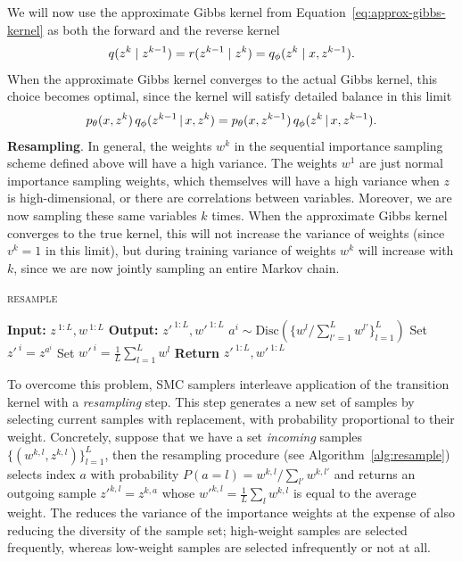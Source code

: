 \documentclass{article}
\theoremstyle{definition}
\begin{document}
We will now use the approximate Gibbs kernel from Equation~\ref{eq:approx-gibbs-kernel} as both the forward and the reverse kernel
\begin{align}
    q(z^{k} \mid  z^{k-1}) = r(z^{k-1} \mid  z^k) = q_\phi(z^k \mid x, z^{k-1}).
\end{align}
When the approximate Gibbs kernel converges to the actual Gibbs kernel, this choice becomes optimal, since the kernel will satisfy detailed balance in this limit
\begin{align*}
    p_\theta(x, z^k) 
    \,
    q_\phi(z^{k-1} \,|\, x, z^{k})
    =
    p_\theta(x, z^{k-1}) 
    \,
    q_\phi(z^{k} \,|\, x, z^{k-1}).
\end{align*}
\textbf{Resampling}. In general, the weights $w^k$ in the sequential importance sampling scheme defined above will have a high variance. The weights $w^1$ are just normal importance sampling weights, which themselves will have a high variance when $z$ is high-dimensional, or there are correlations between variables. Moreover, we are now sampling these same variables $k$ times. When the approximate Gibbs kernel converges to the true kernel, this will not increase the variance of weights (since $v^k=1$ in this limit), but during training variance of weights $w^k$ will increase with $k$, since we are now jointly sampling an entire Markov chain.
\begin{algorithm}[!t]
  \caption{\textsc{resample}}
  \label{alg:resample}
\begin{algorithmic}[1]
\small
  \State \textbf{Input:} $z^{\:1:L}, w^{\:1:L}$
  \State \textbf{Output:} $z'^{\:1:L}, w'^{\:1:L}$
    \State $a^i \sim \mathrm{Disc}(\{w^l / \sum_{l' = 1}^L w^{l'}\}_{l=1}^L)$ 
    \State Set $ z'^{\:i} = z^{a^i}$
    \State Set $ w'^{\:i} = \frac{1}{L} \sum_{l = 1}^L w^l$
    \EndFor
  \State \textbf{Return} $z'^{\:1:L}, w'^{\:1:L}$
\end{algorithmic}
\end{algorithm}
To overcome this problem, SMC samplers interleave application of the transition kernel with a \emph{resampling} step. This step generates a new set of samples by selecting current samples with replacement, with probability proportional to their weight. Concretely, suppose that we have a set \emph{incoming} samples $\{(w^{k,l}, z^{k,l})\}_{l=1}^L$, then the resampling procedure (see Algorithm~\ref{alg:resample}) selects index $a$ with probability $P(a\!=\!l) = w^{k,l} / \sum_{l'} w^{k,l'}$ and returns an outgoing sample $z'^{k,l} = z^{k,a}$ whose $w'^{k,l} = \frac{1}{L} \sum_l w^{k,l}$ is equal to the average weight. The reduces the variance of the importance weights at the expense of also reducing the diversity of the sample set; high-weight samples are selected frequently, whereas low-weight samples are selected infrequently or not at all.
\end{document}
